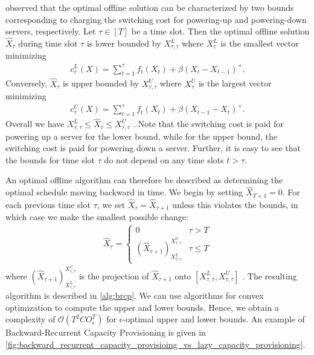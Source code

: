 \citeauthor*{Lin2011} observed that the optimal offline solution can be characterized by two bounds corresponding to charging the switching cost for powering-up and powering-down servers, respectively. Let $\tau \in [T]$ be a time slot. Then the optimal offline solution $\hat{X}_{\tau}$ during time slot $\tau$ is lower bounded by $X_{\tau,\tau}^L$ where $X_{\tau}^L$ is the smallest vector minimizing \begin{align}\label{eq:ud:brcp:lower}
    c_{\tau}^L(X) = \sum_{t=1}^{\tau} f_t(X_t) + \beta (X_t - X_{t-1})^+.
\end{align} Conversely, $\hat{X}_{\tau}$ is upper bounded by $X_{\tau,\tau}^U$ where $X_{\tau}^U$ is the largest vector minimizing \begin{align}\label{eq:ud:brcp:upper}
    c_{\tau}^U(X) = \sum_{t=1}^{\tau} f_t(X_t) + \beta (X_{t-1} - X_t)^+.
\end{align} Overall we have $X_{\tau,\tau}^L \leq \hat{X}_{\tau} \leq X_{\tau,\tau}^U$ \cite{Lin2011}. Note that the switching cost is paid for powering up a server for the lower bound, while for the upper bound, the switching cost is paid for powering down a server. Further, it is easy to see that the bounds for time slot $\tau$ do not depend on any time slots $t > \tau$.

An optimal offline algorithm can therefore be described as determining the optimal schedule moving backward in time. We begin by setting $\hat{X}_{T+1} = 0$. For each previous time slot $\tau$, we set $\hat{X}_{\tau} = \hat{X}_{\tau + 1}$ unless this violates the bounds, in which case we make the smallest possible change: \begin{align*}
    \hat{X}_{\tau} = \begin{cases}
        0 & \tau > T \\
        (\hat{X}_{\tau+1})_{X_{\tau,\tau}^L}^{X_{\tau,\tau}^U} & \tau \leq T
    \end{cases}
\end{align*} where $(\hat{X}_{\tau+1})_{X_{\tau,\tau}^L}^{X_{\tau,\tau}^U}$ is the projection of $\hat{X}_{\tau+1}$ onto $[X_{\tau,\tau}^L, X_{\tau,\tau}^U]$ \cite{Lin2011}. The resulting algorithm is described in \autoref{alg:brcp}. We can use algorithms for convex optimization to compute the upper and lower bounds. Hence, we obtain a complexity of $\mathcal{O}(T^2 C O_{\epsilon}^T)$ for $\epsilon$-optimal upper and lower bounds. An example of Backward-Recurrent Capacity Provisioning is given in \autoref{fig:backward_recurrent_capacity_provisioing_vs_lazy_capacity_provisioning}.

